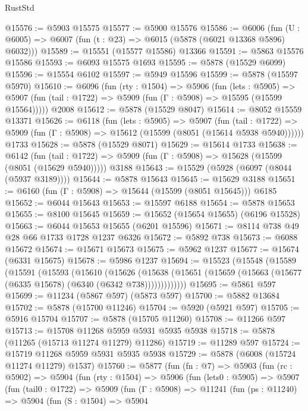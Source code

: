 \begin{lexlean}{RustStd}
\begin{coremodule}
@15576 := @5903 @15575
@15577 := @5900 @15576
@15586 := @6006
    (fun (U : @6005) => @6007 (fun (t : @23) => @6015 (@5878 (@6021 @13368 @5896) @6032)))
@15589 := @15551 (@15577 @15586) @13366
@15591 := @5863 @15576 @15586
@15593 := @6093 @15575 @1693
@15595 := @5878 (@15529 @6099)
@15596 := @15554 @6102
@15597 := @5949 @15596
@15599 := @5878 (@15597 @5970)
@15610 := @6096
    (fun (rty : @1504) =>
    @5906
      (fun (lets : @5905) =>
      @5907 (fun (tail : @1722) => @5909 (fun (Γ : @5908) => @15595 (@15599 @15564)))))
    @2008
@15612 := @5878 (@15529 @8047)
@15614 := @8052 @15559 @13371
@15626 := @6118
    (fun (lets : @5905) =>
    @5907
      (fun (tail : @1722) =>
      @5909 (fun (Γ : @5908) => @15612 (@15599 (@8051 (@15614 @5938 @5940))))))
    @1733
@15628 := @5878 (@15529 @8071)
@15629 := @15614 @1733
@15638 := @6142
    (fun (tail : @1722) => @5909 (fun (Γ : @5908) => @15628 (@15599 (@8051 (@15629 @5940)))))
    @3188
@15643 := @15529 (@5928 (@6097 (@8044 (@5937 @3189))))
@15644 := @5878 @15643
@15645 := @15629 @3188
@15651 := @6160 (fun (Γ : @5908) => @15644 (@15599 (@8051 @15645))) @6185
@15652 := @6044 @15643
@15653 := @15597 @6188
@15654 := @5878 @15653
@15655 := @8100 @15645
@15659 := @15652 (@15654 @15655) (@6196 @15528)
@15663 := @6044 @15653 @15655 (@6201 @15596)
@15671 := @8114 @738 @49 @28 @66 @1733 @1728 @1237 @6326
@15672 := @5892 @738
@15673 := @6088 @15672
@15674 := @15671 @15673
@15675 := @5962 @1237
@15677 := @15674 (@6331 @15675)
@15678 := @5986 @1237
@15694 := @15523
    (@15548
      (@15589
        (@15591
          (@15593
            (@15610
              (@15626
                (@15638
                  (@15651 (@15659 (@15663 (@15677 (@6335 @15678) (@6340 (@6342 @738)))))))))))))
@15695 := @5861 @597
@15699 := @11234 (@5867 @597) (@5873 @597)
@15700 := @5882 @13684
@15702 := @5878 (@15700 @11246)
@15704 := @5920 (@5921 @597)
@15705 := @5916 @15704
@15707 := @5878 (@15705 @11260)
@15708 := @11266 @597
@15713 := @15708 @11268 @5959 @5931 @5935 @5938
@15718 := @5878 (@11265 (@15713 @11274 @11279) @11286)
@15719 := @11289 @597
@15724 := @15719 @11268 @5959 @5931 @5935 @5938
@15729 := @5878 (@6008 (@15724 @11274 @11279) @1537)
@15760 := @5877
    (fun (fn : @7) =>
    @5903
      (fun (rc : @5902) =>
      @5904
        (fun (rty : @1504) =>
        @5906
          (fun (lets0 : @5905) =>
          @5907
            (fun (tail0 : @1722) =>
            @5909
              (fun (Γ : @5908) =>
              @11241
                (fun (ps : @11240) =>
                @5904
                  (fun (S : @1504) =>
                  @5904

\end{coremodule}
\end{lexlean}
